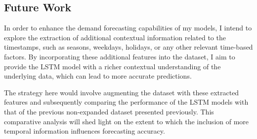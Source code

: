 \documentclass[10pt, journal, letterpaper, compsoc]{IEEEtran}
\begin{document}
\subsection{Future Work}
In order to enhance the demand forecasting capabilities of my models, I intend to explore the extraction of additional contextual information related to the timestamps, such as seasons, weekdays, holidays, or any other relevant time-based factors. By incorporating these additional features into the dataset, I aim to provide the LSTM model with a richer contextual understanding of the underlying data, which can lead to more accurate predictions.

The strategy here would involve augmenting the dataset with these extracted features and subsequently comparing the performance of the LSTM models with that of the previous non-expanded dataset presented previously. This comparative analysis will shed light on the extent to which the inclusion of more temporal information influences forecasting accuracy.



\clearpage
\printbibliography %
\end{document}
